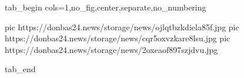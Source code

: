  
 
 
 
 

\ifcmt
  tab_begin cols=1,no_fig,center,separate,no_numbering

     pic https://donbas24.news/storage/news/ojlqtbzkdiela85f.jpg
		 pic https://donbas24.news/storage/news/cqr5oxvzkare8lsu.jpg
		 pic https://donbas24.news/storage/news/2oxeaof897szjdvu.jpg

  tab_end
\fi
